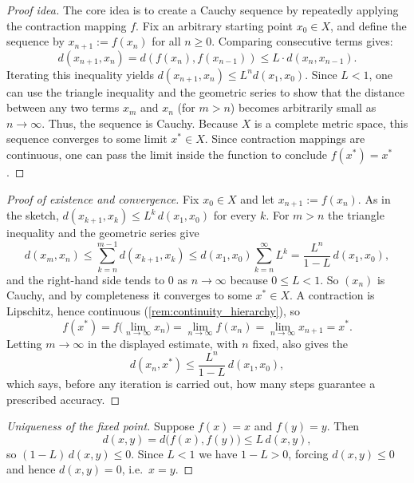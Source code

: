 \begin{proof}[Proof idea]
The core idea is to create a Cauchy sequence by repeatedly applying the contraction mapping $f$.
Fix an arbitrary starting point $x_0 \in X$, and define the sequence by $x_{n+1} := f(x_n)$ for all $n \geq 0$.
Comparing consecutive terms gives:
\[
d(x_{n+1}, x_n) = d(f(x_n), f(x_{n-1})) \leq L \cdot d(x_n, x_{n-1}).
\]
Iterating this inequality yields $d(x_{n+1}, x_n) \leq L^n d(x_1, x_0)$. Since $L < 1$, one can use the triangle inequality and the geometric series to show that the distance between any two terms $x_m$ and $x_n$ (for $m > n$) becomes arbitrarily small as $n \to \infty$. Thus, the sequence is Cauchy.
Because $X$ is a complete metric space, this sequence converges to some limit $x^* \in X$. Since contraction mappings are continuous, one can pass the limit inside the function to conclude $f(x^*) = x^*$.
\end{proof}

\begin{proof}[Proof of existence and convergence]
Fix $x_0 \in X$ and let $x_{n+1} := f(x_n)$. As in the sketch,
$d(x_{k+1},x_k) \leq L^k\,d(x_1,x_0)$ for every $k$. For $m > n$ the triangle inequality and the
geometric series give
\[d(x_m,x_n) \leq \sum_{k=n}^{m-1} d(x_{k+1},x_k) \leq d(x_1,x_0)\sum_{k=n}^{\infty}L^k
  = \frac{L^n}{1-L}\,d(x_1,x_0),\]
and the right-hand side tends to $0$ as $n \to \infty$ because $0 \leq L < 1$. So $(x_n)$ is
Cauchy, and by completeness it converges to some $x^* \in X$. A contraction is Lipschitz, hence
continuous (\cref{rem:continuity_hierarchy}), so
\[f(x^*) = f\Big(\lim_{n\to\infty}x_n\Big) = \lim_{n\to\infty}f(x_n) = \lim_{n\to\infty}x_{n+1} = x^*.\]
Letting $m \to \infty$ in the displayed estimate, with $n$ fixed, also gives the
\[d(x_n,x^*) \leq \frac{L^n}{1-L}\,d(x_1,x_0),\]
which says, before any iteration is carried out, how many steps guarantee a prescribed accuracy.
\end{proof}

\begin{proof}[Uniqueness of the fixed point]
Suppose $f(x) = x$ and $f(y) = y$. Then
\[d(x,y) = d\big(f(x),f(y)\big) \leq L\,d(x,y),\]
so $(1-L)\,d(x,y) \leq 0$. Since $L<1$ we have $1-L>0$, forcing $d(x,y) \leq 0$ and hence
$d(x,y)=0$, i.e.\ $x=y$.
\end{proof}

